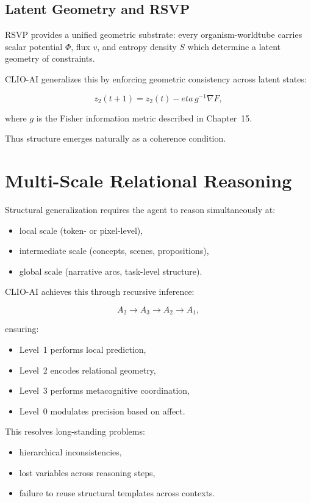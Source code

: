 \documentclass[12pt,oneside]{book}
\theoremstyle{plain}
\theoremstyle{definition}
\def\eta{eta}%
\begin{document}
\subsection{Latent Geometry and RSVP}

RSVP provides a unified geometric substrate:
every organism-worldtube carries scalar potential $\Phi$, flux $v$, and entropy
density $S$ which determine a latent geometry of constraints.

CLIO-AI generalizes this by enforcing geometric consistency across latent states:

\[
z_2(t+1) = z_2(t) - \eta \, g^{-1} \nabla F,
\]

where $g$ is the Fisher information metric described in Chapter~15.

Thus structure emerges naturally as a coherence condition.

\section{Multi-Scale Relational Reasoning}

Structural generalization requires the agent to reason simultaneously at:

\begin{itemize}
    \item local scale (token- or pixel-level),
    \item intermediate scale (concepts, scenes, propositions),
    \item global scale (narrative arcs, task-level structure).
\end{itemize}

CLIO-AI achieves this through recursive inference:

\[
A_2 \rightarrow A_3 \rightarrow A_2 \rightarrow A_1,
\]

ensuring:

\begin{itemize}
    \item Level~1 performs local prediction,
    \item Level~2 encodes relational geometry,
    \item Level~3 performs metacognitive coordination,
    \item Level~0 modulates precision based on affect.
\end{itemize}

This resolves long-standing problems:

\begin{itemize}
    \item hierarchical inconsistencies,
    \item lost variables across reasoning steps,
    \item failure to reuse structural templates across contexts.
\end{itemize}
\end{document}
